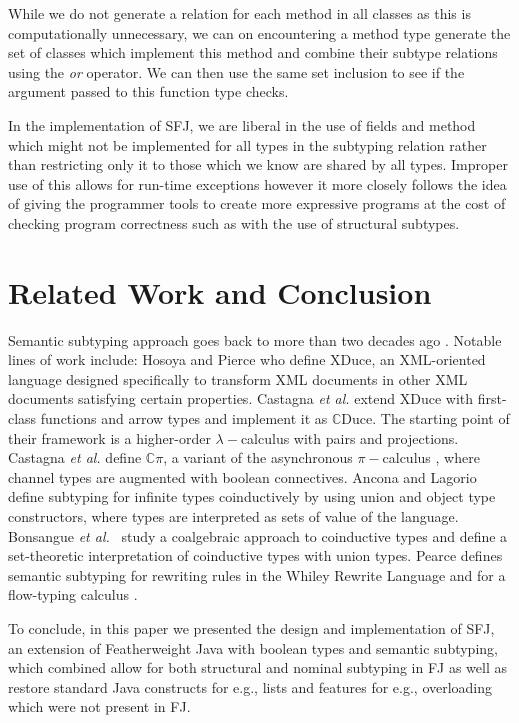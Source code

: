 \documentclass[runningheads]{llncs}
\begin{document}
While we do not generate a relation for each method in all classes as this is computationally unnecessary, we can on encountering a method type generate the set of classes which implement this method and combine their subtype relations using the \textit{or} operator. 
We can then use the same set inclusion to see if the argument passed to this function type checks. 

In the implementation of SFJ, we are liberal in the use of fields and method which might not be implemented for all types in the subtyping relation rather than restricting only it to those which we know are shared by all types.
Improper use of this allows for run-time exceptions however it more closely follows the idea of giving the programmer tools to create more expressive programs at the cost of checking program correctness such as with the use of structural subtypes. 


\section{Related Work and Conclusion}
\label{sec:conclusion}
Semantic subtyping approach goes back to more than two decades ago \cite{Aiken,Damm}.
Notable lines of work include:
Hosoya and Pierce \cite{XML1,XML2,XML3} who define XDuce, an XML-oriented language designed specifically to transform XML documents in other XML documents satisfying certain properties.
Castagna \emph{et al.} \cite{gentle,Cas05,FCB08} extend XDuce with first-class functions and arrow types and implement it as $\mathbb{C}$Duce. The starting point of their framework is a higher-order $\lambda-$calculus with pairs and projections.
Castagna \emph{et al.} \cite{Cpi} define $\mathbb{C}\pi$, a variant of the asynchronous $\pi-$calculus \cite{sangiorgi}, where channel types are augmented with boolean connectives.
Ancona and Lagorio~\cite{AL10} define subtyping for infinite types coinductively by using union and object type constructors, where types are interpreted as sets of value of the language.
Bonsangue \emph{et al.}~\cite{BRABR14} study a coalgebraic approach to coinductive types and define a set-theoretic interpretation of coinductive types with union types.
Pearce \cite{Pearce19} defines semantic subtyping for rewriting rules in the Whiley Rewrite Language and for a flow-typing calculus  \cite{Pearce13}.

To conclude, in this paper we presented the design and implementation of SFJ, an extension of Featherweight Java with boolean types and semantic subtyping, which combined allow for both structural and nominal subtyping in FJ as well as restore standard Java constructs for e.g., lists and features for e.g., overloading which were not present in FJ.

\newpage


\end{document}
